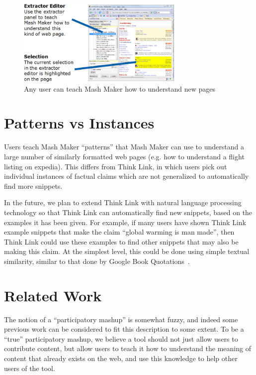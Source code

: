 \documentclass{chi2009}
\begin{document}
\begin{figure}[tb]
	\begin{center}
	\includegraphics[width=8cm]{../mmpics/extractor_summary.png}
	\caption{Any user can teach Mash Maker how to understand new pages}
	\label{extractedit}
	\end{center}
\end{figure}


\section{Patterns vs Instances}

Users teach Mash Maker ``patterns'' that Mash Maker can use to understand a large number of similarly formatted web pages (e.g. how to understand a flight listing on expedia). This differs from Think Link, in which users pick out individual instances of factual claims which are not generalized to automatically find more snippets.

In the future, we plan to extend Think Link with natural language processing technology so that Think Link can automatically find new snippets, based on the examples it has been given. For example, if many users have shown Think Link example snippets that make the claim ``global warming is man made'', then Think Link could use these examples to find other snippets that may also be making this claim. At the simplest level, this could be done using simple textual similarity, similar to that done by Google Book Quotations~\cite{quotations}.


\section{Related Work}

The notion of a ``participatory mashup'' is somewhat fuzzy, and indeed some previous work can be considered to fit this description to some extent. To be a ``true'' participatory mashup, we believe a tool should not just allow users to contribute content, but allow users to teach it how to understand the meaning of content that already exists on the web, and use this knowledge to help other users of the tool.
\end{document}
